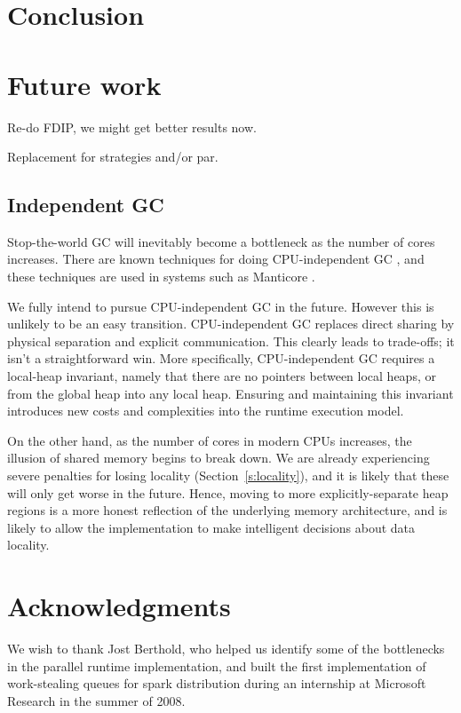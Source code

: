 \documentclass[twocolumn,9pt]{sigplanconf}
\begin{document}
\section{Conclusion}
\label{s:conclusion}

\section{Future work}

Re-do FDIP, we might get better results now.

Replacement for strategies and/or par.

\subsection{Independent GC}
\label{s:independent-gc}

Stop-the-world GC will inevitably become a bottleneck as the number of
cores increases.  There are known techniques for doing CPU-independent
GC \cite{doliguez:concurrent}, and these techniques are used in
systems such as Manticore \cite{fluet:manticore}.  

We fully intend to pursue CPU-independent GC in the future.  However
this is unlikely to be an easy transition.
CPU-independent GC replaces direct sharing by physical separation and
explicit communication.  This clearly leads to trade-offs; it isn't a
straightforward win.  More specifically, CPU-independent GC requires a
local-heap invariant, namely that there are no pointers between local
heaps, or from the global heap into any local heap.  Ensuring and
maintaining this invariant introduces new costs and complexities into
the runtime execution model.  

On the other hand, as the number of cores in modern CPUs increases,
the illusion of shared memory begins to break down.  We are already
experiencing severe penalties for losing locality (Section~\ref{s:locality}), and it
is likely that these will only get worse in the future.  Hence, moving
to more explicitly-separate heap regions is a more honest reflection
of the underlying memory architecture, and is likely to allow the
implementation to make intelligent decisions about data locality.

\section*{Acknowledgments}

We wish to thank Jost Berthold, who helped us identify some of the
bottlenecks in the parallel runtime implementation, and built the
first implementation of work-stealing queues for spark distribution
during an internship at Microsoft Research in the summer of 2008.

{\tiny


}
\end{document}
